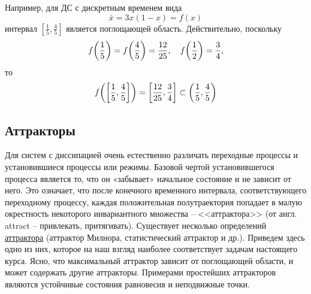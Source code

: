 Например, для ДС с дискретным временем вида
\begin{equation}
	\bar x = 3x(1-x)= f(x)
\end{equation}
интервал $[\frac15, \frac45]$ является поглощающей область. Действительно, поскольку 
\begin{equation}
	f\qty(\frac15)=f\qty(\frac45)=\frac{12}{25},\quad f\qty(\frac12)=\frac34,
\end{equation}
то 
\begin{equation}
	f\qty(\qty[\frac15,\frac45])= \qty[\frac{12}{25}, \frac34]\subset \qty(\frac15,\frac45)
\end{equation}

\subsection{Аттракторы} %

Для систем с диссипацией очень естественно различать переходные процессы и установившиеся процессы или режимы. Базовой чертой установившегося процесса является то, что он «забывает» начальное состояние и не зависит от него. Это означает, что после конечного временного интервала, соответствующего переходному процессу, каждая положительная
полутраектория попадает в малую окрестность некоторого инвариантного множества – <<аттрактора>> (от англ. attract – привлекать, притягивать). Существует несколько определений \href{https://ru.wikipedia.org/wiki/%D0%90%D1%82%D1%82%D1%80%D0%B0%D0%BA%D1%82%D0%BE%D1%80}{аттрактора} (аттрактор Милнора,
статистический аттрактор и др.). Приведем здесь одно из них, которое на наш взгляд наиболее соответствует задачам настоящего курса.
Ясно, что максимальный аттрактор зависит от поглощающей области, и может содержать другие аттракторы. Примерами простейших аттракторов являются устойчивые состояния равновесия и неподвижные точки.


